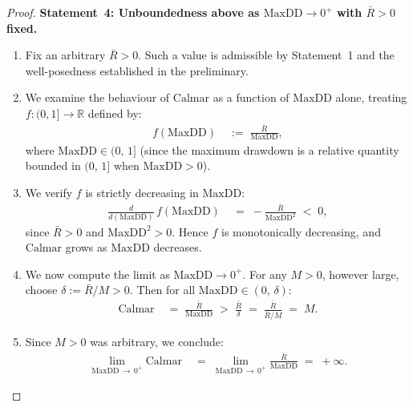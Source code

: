 \documentclass[12pt,openany]{book}
\newcommand{\MaxDD}{\mathrm{MaxDD}}
\numberwithin{equation}{chapter}
\theoremstyle{plain}
\theoremstyle{definition}
\theoremstyle{remark}
\numberwithin{equation}{chapter}
\theoremstyle{plain}
\begin{document}
\begin{proof}
\medskip
\noindent\textbf{Statement~4: Unboundedness above as
$\MaxDD \to 0^{+}$ with $\bar{R} > 0$ fixed.}

\begin{enumerate}
  \item Fix an arbitrary $\bar{R} > 0$.  Such a value is
        admissible by Statement~1 and the well-posedness
        established in the preliminary.

  \item We examine the behaviour of $\mathrm{Calmar}$
        as a function of $\MaxDD$ alone, treating
        $f\colon(0,1] \to \mathbb{R}$ defined by:
        \begin{align}
          f(\MaxDD)
            &\;:=\; \frac{\bar{R}}{\MaxDD},
          \label{eq:calmar-proof-func}
        \end{align}
        where $\MaxDD \in (0,\,1]$ (since the maximum
        drawdown is a relative quantity bounded in
        $(0,\,1]$ when $\MaxDD > 0$).

  \item We verify $f$ is strictly decreasing in $\MaxDD$:
        \begin{align}
          \frac{d}{d(\MaxDD)}\,f(\MaxDD)
            &\;=\; -\frac{\bar{R}}{\MaxDD^{2}}
             \;<\; 0,
          \label{eq:calmar-proof-deriv}
        \end{align}
        since $\bar{R} > 0$ and $\MaxDD^{2} > 0$.
        Hence $f$ is monotonically decreasing, and
        $\mathrm{Calmar}$ grows as $\MaxDD$ decreases.

  \item We now compute the limit as $\MaxDD \to 0^{+}$.
        For any $M > 0$, however large, choose
        $\delta := \bar{R}/M > 0$.  Then for all
        $\MaxDD \in (0,\,\delta)$:
        \begin{align}
          \mathrm{Calmar}
            &\;=\; \frac{\bar{R}}{\MaxDD}
             \;>\; \frac{\bar{R}}{\delta}
             \;=\; \frac{\bar{R}}{\bar{R}/M}
             \;=\; M.
          \label{eq:calmar-proof-limit}
        \end{align}

  \item Since $M > 0$ was arbitrary, we conclude:
        \begin{align}
          \lim_{\MaxDD \,\to\, 0^{+}}
          \mathrm{Calmar}
            &\;=\; \lim_{\MaxDD \,\to\, 0^{+}}
                   \frac{\bar{R}}{\MaxDD}
             \;=\; +\infty.
          \label{eq:calmar-proof-infty}
        \end{align}


\end{enumerate}
\end{proof}
\end{document}

